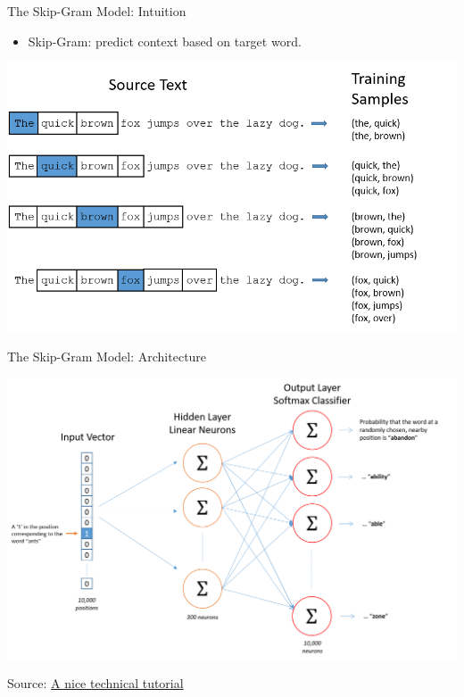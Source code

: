 \documentclass[professionalfonts, xcolor={usenames,svgnames,x11names,table}]{beamer}
\begin{document}
\begin{frame}{The Skip-Gram Model: Intuition}

	\begin{itemize}
	\item Skip-Gram: predict \alert{context} based on \alert{target} word.
	\end{itemize}

\begin{center}
        \includegraphics[width=1\linewidth]{./img/skip_gram_training}
\end{center}
\end{frame}

\begin{frame}{The Skip-Gram Model: Architecture}

\begin{center}
        \includegraphics[width=1\linewidth]{./img/skip_gram1}
\end{center}

\footnotesize{Source: \href{https://israelg99.github.io/2017-03-23-Word2Vec-Explained/}{A nice technical tutorial}}
\end{frame}
\end{document}

